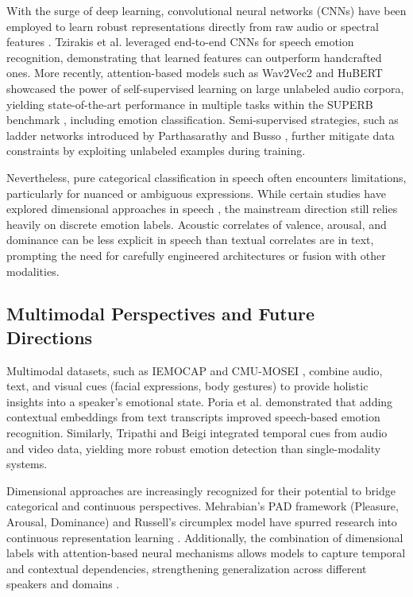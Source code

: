 \documentclass[conference]{IEEEtran}
\begin{document}
With the surge of deep learning, convolutional neural networks (CNNs) have been employed to learn robust representations directly from raw audio or spectral features \cite{latif2020deep}. Tzirakis et al. \cite{tzirakis2017endtoend} leveraged end-to-end CNNs for speech emotion recognition, demonstrating that learned features can outperform handcrafted ones. More recently, attention-based models such as Wav2Vec2 \cite{wang2021finetuned} and HuBERT \cite{hsu2021hubert} showcased the power of self-supervised learning on large unlabeled audio corpora, yielding state-of-the-art performance in multiple tasks within the SUPERB benchmark \cite{yang2021superb}, including emotion classification. Semi-supervised strategies, such as ladder networks introduced by Parthasarathy and Busso \cite{parthasarathy2020semi}, further mitigate data constraints by exploiting unlabeled examples during training.

Nevertheless, pure categorical classification in speech often encounters limitations, particularly for nuanced or ambiguous expressions. While certain studies have explored dimensional approaches in speech \cite{kaya2015contrasting, garcia2013dynamic}, the mainstream direction still relies heavily on discrete emotion labels. Acoustic correlates of valence, arousal, and dominance can be less explicit in speech than textual correlates are in text, prompting the need for carefully engineered architectures or fusion with other modalities.

\subsection{Multimodal Perspectives and Future Directions}
Multimodal datasets, such as IEMOCAP \cite{busso2008iemocap} and CMU-MOSEI \cite{zadeh2018multimodal}, combine audio, text, and visual cues (facial expressions, body gestures) to provide holistic insights into a speaker's emotional state. Poria et al. \cite{poria2017context} demonstrated that adding contextual embeddings from text transcripts improved speech-based emotion recognition. Similarly, Tripathi and Beigi \cite{tripathi2018multi} integrated temporal cues from audio and video data, yielding more robust emotion detection than single-modality systems.

Dimensional approaches are increasingly recognized for their potential to bridge categorical and continuous perspectives. Mehrabian's PAD framework (Pleasure, Arousal, Dominance) \cite{mehrabian1995framework} and Russell's circumplex model \cite{russell1980circumplex} have spurred research into continuous representation learning \cite{grimm2007svr, subathra2023comparative}. Additionally, the combination of dimensional labels with attention-based neural mechanisms allows models to capture temporal and contextual dependencies, strengthening generalization across different speakers and domains \cite{poria2019emotion}.
\end{document}
